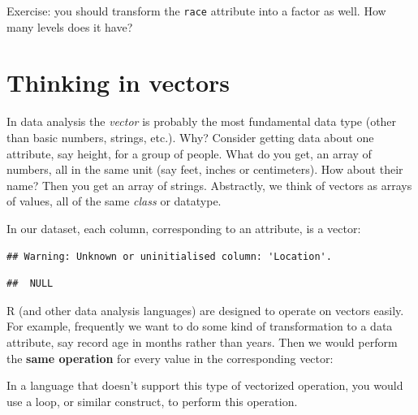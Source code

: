 \documentclass[12pt,]{book}
\newenvironment{Shaded}{\begin{snugshade}}{\end{snugshade}}
\newcommand{\KeywordTok}[1]{\textcolor[rgb]{0.13,0.29,0.53}{\textbf{#1}}}
\newcommand{\DecValTok}[1]{\textcolor[rgb]{0.00,0.00,0.81}{#1}}
\newcommand{\StringTok}[1]{\textcolor[rgb]{0.31,0.60,0.02}{#1}}
\newcommand{\CommentTok}[1]{\textcolor[rgb]{0.56,0.35,0.01}{\textit{#1}}}
\newcommand{\OperatorTok}[1]{\textcolor[rgb]{0.81,0.36,0.00}{\textbf{#1}}}
\newcommand{\NormalTok}[1]{#1}
\theoremstyle{definition}
\theoremstyle{definition}
\theoremstyle{remark}
\begin{document}
Exercise: you should transform the \texttt{race} attribute into a factor
as well. How many levels does it have?

\section{Thinking in vectors}\label{thinking-in-vectors}

In data analysis the \emph{vector} is probably the most fundamental data
type (other than basic numbers, strings, etc.). Why? Consider getting
data about one attribute, say height, for a group of people. What do you
get, an array of numbers, all in the same unit (say feet, inches or
centimeters). How about their name? Then you get an array of strings.
Abstractly, we think of vectors as arrays of values, all of the same
\emph{class} or datatype.

In our dataset, each column, corresponding to an attribute, is a vector:

\begin{Shaded}
\end{Shaded}

\begin{verbatim}
## Warning: Unknown or uninitialised column: 'Location'.
\end{verbatim}

\begin{verbatim}
##  NULL
\end{verbatim}

R (and other data analysis languages) are designed to operate on vectors
easily. For example, frequently we want to do some kind of
transformation to a data attribute, say record age in months rather than
years. Then we would perform the \textbf{same operation} for every value
in the corresponding vector:

\begin{Shaded}
\end{Shaded}

In a language that doesn't support this type of vectorized operation,
you would use a loop, or similar construct, to perform this operation.
\end{document}

